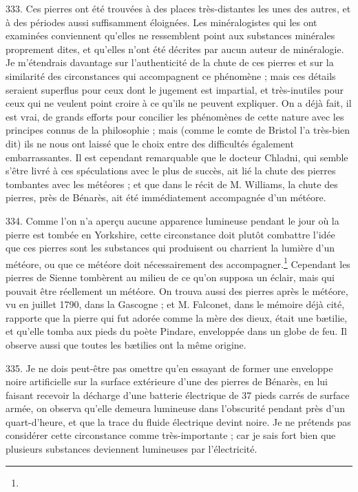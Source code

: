\documentclass[a4paper, 11pt, oneside, polutonikogreek, french]{article}
\begin{document}
333. Ces pierres ont été trouvées à des places très-distantes les unes des autres, et à des périodes aussi suffisamment éloignées. Les minéralogistes qui les ont examinées conviennent qu'elles ne ressemblent point aux substances minérales proprement dites, et qu'elles n'ont été décrites par aucun auteur de minéralogie. Je m'étendrais davantage sur l'authenticité de la chute de ces pierres et sur la similarité des circonstances qui accompagnent ce phénomène ; mais ces détails seraient superflus pour ceux dont le jugement est impartial, et très-inutiles pour ceux qui ne veulent point croire à ce qu'ils ne peuvent expliquer. On a déjà fait, il est vrai, de grands efforts pour concilier les phénomènes de cette nature avec les principes connus de la philosophie ; mais (comme le comte de Bristol l'a très-bien dit) ils ne nous ont laissé que le choix entre des difficultés également embarrassantes. Il est cependant remarquable que le docteur Chladni, qui semble s'être livré à ces spéculations avec le plus de succès, ait lié la chute des pierres tombantes avec les météores ; et que dans le récit de M. Williams, la chute des pierres, près de Bénarès, ait été immédiatement accompagnée d'un météore.

334. Comme l'on n'a aperçu aucune apparence lumineuse pendant le jour où la pierre est tombée en Yorkshire, cette circonstance doit plutôt combattre l'idée que ces pierres sont les substances qui produisent ou charrient la lumière d'un météore, ou que ce météore doit nécessairement des accompagner.\footnote{} Cependant les pierres de Sienne tombèrent au milieu de ce qu'on supposa un éclair, mais qui pouvait être réellement un météore. On trouva aussi des pierres après le météore, vu en juillet 1790, dans la Gascogne ; et M. Falconet, dans le mémoire déjà cité, rapporte que la pierre qui fut adorée comme la mère des dieux, était une bætilie, et qu'elle tomba aux pieds du poète Pindare, enveloppée dans un globe de feu. Il observe aussi que toutes les bætilies ont la même origine.

335. Je ne dois peut-être pas omettre qu'en essayant de former une enveloppe noire artificielle sur la surface extérieure d'une des pierres de Bénarès, en lui faisant recevoir la décharge d'une batterie électrique de 37 pieds carrés de surface armée, on observa qu'elle demeura lumineuse dans l'obscurité pendant près d'un quart-d'heure, et que la trace du fluide électrique devint noire. Je ne prétends pas considérer cette circonstance comme très-importante ; car je sais fort bien que plusieurs substances deviennent lumineuses par l'électricité.
\end{document}
